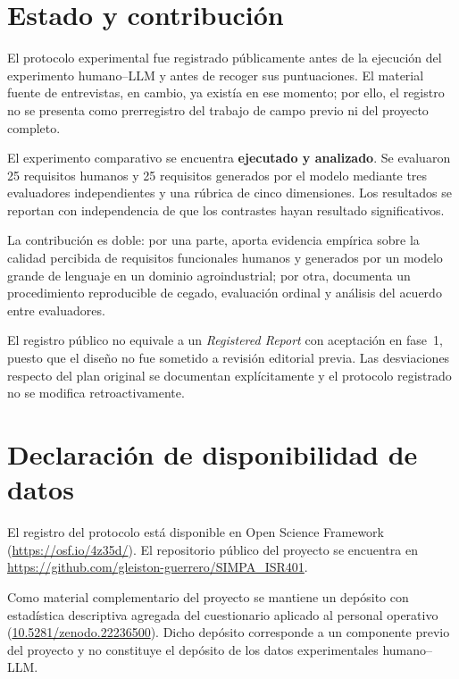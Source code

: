 \documentclass[runningheads]{llncs}
\begin{document}
\section{Estado y contribuci\'on}
\label{sec:estado}

El protocolo experimental fue registrado p\'ublicamente antes de la ejecuci\'on
del experimento humano--LLM y antes de recoger sus puntuaciones. El material
fuente de entrevistas, en cambio, ya exist\'ia en ese momento; por ello, el
registro no se presenta como prerregistro del trabajo de campo previo ni del
proyecto completo.

El experimento comparativo se encuentra \textbf{ejecutado y analizado}. Se
evaluaron 25 requisitos humanos y 25 requisitos generados por el modelo mediante
tres evaluadores independientes y una r\'ubrica de cinco dimensiones. Los
resultados se reportan con independencia de que los contrastes hayan resultado
significativos.

La contribuci\'on es doble: por una parte, aporta evidencia emp\'irica sobre la
calidad percibida de requisitos funcionales humanos y generados por un modelo
grande de lenguaje en un dominio agroindustrial; por otra, documenta un
procedimiento reproducible de cegado, evaluaci\'on ordinal y an\'alisis del acuerdo
entre evaluadores.

El registro p\'ublico no equivale a un \emph{Registered Report} con aceptaci\'on
en fase~1, puesto que el dise\~no no fue sometido a revisi\'on editorial previa.
Las desviaciones respecto del plan original se documentan expl\'icitamente y el
protocolo registrado no se modifica retroactivamente.
\section*{Declaraci\'on de disponibilidad de datos}

El registro del protocolo est\'a disponible en Open Science Framework
(\url{https://osf.io/4z35d/}). El repositorio p\'ublico del proyecto se encuentra
en \url{https://github.com/gleiston-guerrero/SIMPA_ISR401}.

Como material complementario del proyecto se mantiene un dep\'osito con
estad\'istica descriptiva agregada del cuestionario aplicado al personal operativo
(\href{https://doi.org/10.5281/zenodo.22236500}{10.5281/zenodo.22236500}).
Dicho dep\'osito corresponde a un componente previo del proyecto y no constituye
el dep\'osito de los datos experimentales humano--LLM.
\end{document}
